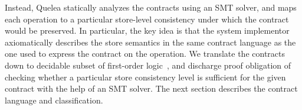 Instead, Quelea statically analyzes the contracts using an SMT solver, and maps
each operation to a particular store-level consistency under which the contract
would be preserved. In particular, the key idea is that the system implementor
axiomatically describes the store semantics in the same contract language as
the one used to express the contract on the operation. We translate the
contracts down to decidable subset of first-order logic~\cite{}, and discharge
proof obligation of checking whether a particular store consistency level is
sufficient for the given contract with the help of an SMT solver. The next
section describes the contract language and classification.
